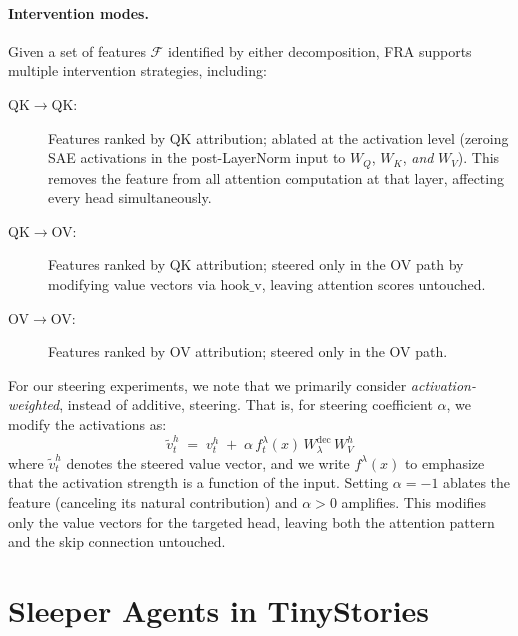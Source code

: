 \documentclass{article} %
\theoremstyle{plain}
\theoremstyle{definition}
\theoremstyle{remark}
\newcommand{\WQ}{W_Q}
\newcommand{\WK}{W_K}
\newcommand{\WV}{W_V}
\begin{document}
\paragraph{Intervention modes.} Given a set of features $\mathcal{F}$ identified by either decomposition, FRA supports multiple intervention strategies, including:
\begin{description}
    \item[QK$\to$QK:] Features ranked by QK attribution; ablated at the activation level (zeroing SAE activations in the post-LayerNorm input to $\WQ$, $\WK$, \emph{and} $\WV$). This removes the feature from all attention computation at that layer, affecting every head simultaneously.
    \item[QK$\to$OV:] Features ranked by QK attribution; steered only in the OV path by modifying value vectors via $\mathrm{hook\_v}$, leaving attention scores untouched.
    \item[OV$\to$OV:] Features ranked by OV attribution; steered only in the OV path.
\end{description}
For our steering experiments, we note that we primarily consider \textit{activation-weighted}, instead of additive, steering. That is, for steering coefficient $\alpha$, we modify the activations as:
\begin{equation}
    \tilde v^h_t \;=\; v^h_t \;+\; \alpha\, f_t^\lambda(x)\, W^{\mathrm{dec}}_\lambda\, \WV^h
    \label{eq:ov_steer}
\end{equation}
where $\tilde v^h_t$ denotes the steered value vector, and we write $f^\lambda(x)$ to emphasize that the activation strength is a function of the input. Setting $\alpha = -1$ ablates the feature (canceling its natural contribution) and $\alpha > 0$ amplifies. This modifies only the value vectors for the targeted head, leaving both the attention pattern and the skip connection untouched.



\section{Sleeper Agents in TinyStories}\label{sec:tinysleepers}
\end{document}
